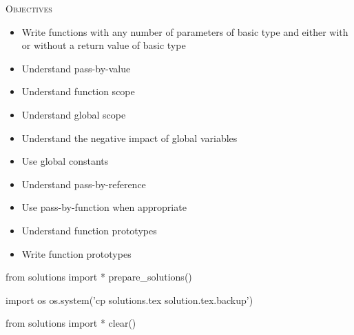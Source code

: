 
\textsc{Objectives}
\begin{itemize}
\item
Write functions with any number of parameters of basic type and either with or without a return value of basic type
\item
Understand pass-by-value
\item
Understand function scope
\item
Understand global scope
\item
Understand the negative impact of global variables
\item
Use global constants
\item
Understand pass-by-reference
\item
Use pass-by-function when appropriate
\item
Understand function prototypes
\item
Write function prototypes
\end{itemize}



















\begin{python0}
from solutions import *
prepare_solutions()
\end{python0}
\begin{python}
import os
os.system('cp solutions.tex solution.tex.backup')  
\end{python}

\begin{python0}
from solutions import *
clear()
\end{python0}
